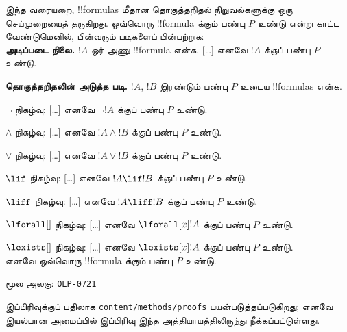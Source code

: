 \documentclass[11pt,a4paper,openany]{memoir}
\begin{document}
\begin{explain}
இந்த வரையறை, !!{formula}s மீதான தொகுத்தறிதல் நிறுவல்களுக்கு
ஒரு செய்முறையைத் தருகிறது. ஒவ்வொரு !!{formula} க்கும்
பண்பு $P$ உண்டு என்று காட்ட வேண்டுமெனில், பின்வரும்
படிகளைப் பின்பற்றுக:\\

\textbf{அடிப்படை நிலை.} $!A$ ஓர் அணு !!{formula} என்க.
[\ldots] எனவே $!A$ க்குப் பண்பு $P$ உண்டு.

\textbf{தொகுத்தறிதலின் அடுத்த படி.} $!A$, $!B$ இரண்டும்
பண்பு $P$ உடைய !!{formula}s என்க.

$\lnot$ நிகழ்வு: [\ldots] எனவே $\lnot !A$ க்குப் பண்பு $P$ உண்டு.

$\land$ நிகழ்வு: [\ldots] எனவே $!A \land !B$ க்குப் பண்பு $P$ உண்டு.

$\lor$ நிகழ்வு: [\ldots] எனவே $!A \lor !B$ க்குப் பண்பு $P$ உண்டு.

$\lif$ நிகழ்வு: [\ldots] எனவே $!A \lif !B$ க்குப் பண்பு $P$ உண்டு.

$\liff$ நிகழ்வு: [\ldots] எனவே $!A \liff !B$ க்குப் பண்பு $P$ உண்டு.

$\lforall[]$ நிகழ்வு: [\ldots] எனவே $\lforall[x] !A$ க்குப் பண்பு $P$ உண்டு.

$\lexists[]$ நிகழ்வு: [\ldots] எனவே $\lexists[x] !A$ க்குப் பண்பு $P$ உண்டு. \\

எனவே ஒவ்வொரு !!{formula} க்கும் பண்பு $P$ உண்டு.
\end{explain}



\clearpage
\noindent மூல அலகு: \texttt{OLP-0721}\par




\begin{editorial}
இப்பிரிவுக்குப் பதிலாக \verb|content/methods/proofs| பயன்படுத்தப்படுகிறது;
எனவே இயல்பான அமைப்பில் இப்பிரிவு இந்த அத்தியாயத்திலிருந்து
நீக்கப்பட்டுள்ளது.
\end{editorial}
\end{document}
